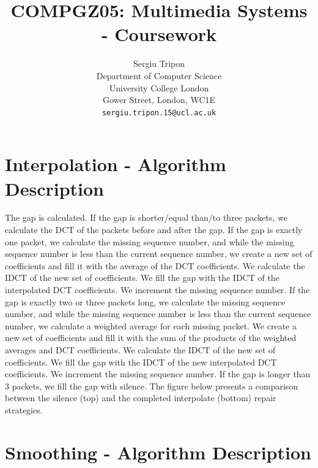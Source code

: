 \documentclass{article} %
\title{COMPGZ05: Multimedia Systems - Coursework}
\author{
Sergiu Tripon\\
Department of Computer Science\\
University College London\\
Gower Street, London, WC1E\\
\texttt{sergiu.tripon.15@ucl.ac.uk}\\
}
\begin{document}
\maketitle

\section{Interpolation - Algorithm Description}

The gap is calculated. If the gap is shorter/equal than/to three packets, we calculate the DCT of the packets before and after the gap. If the gap is exactly one packet, we calculate the missing sequence number, and while the missing sequence number is less than the current sequence number, we create a new set of coefficients and fill it with the average of the DCT coefficients. We calculate the IDCT of the new set of coefficients. We fill the gap with the IDCT of the interpolated DCT coefficients. We increment the missing sequence number. If the gap is exactly two or three packets long, we calculate the missing sequence number, and while the missing sequence number is less than the current sequence number, we calculate a weighted average for each missing packet. We create a new set of coefficients and fill it with the sum of the products of the weighted averages and DCT coefficients. We calculate the IDCT of the new set of coefficients. We fill the gap with the IDCT of the new interpolated DCT coefficients. We increment the missing sequence number. If the gap is longer than 3 packets, we fill the gap with silence. The figure below presents a comparison between the silence (top) and the completed interpolate (bottom) repair strategies.

\begin{figure}[!htbp]
\centering
{}
\end{figure}

\section{Smoothing - Algorithm Description}
\end{document}
